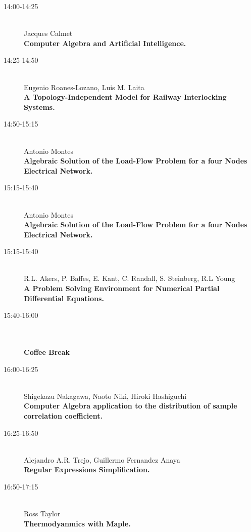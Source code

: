 \begin{description}
\item[14:00-14:25] \ \\
  Jacques Calmet\\
  {\bf Computer Algebra and Artificial Intelligence.} 
\item[14:25-14:50 ] \ \\
  Eugenio Roanes-Lozano, Luis M. Laita\\
  {\bf A Topology-Independent Model for Railway Interlocking Systems.} 
\item[14:50-15:15] \ \\
  Antonio Montes \\
  {\bf Algebraic Solution of the Load-Flow Problem for a four Nodes Electrical Network.
} 
\item[15:15-15:40] \ \\
  Antonio Montes\\
  {\bf Algebraic Solution of the Load-Flow Problem for a four Nodes Electrical Network.} 
\item[15:15-15:40] \ \\
  R.L. Akers, P. Baffes, E. Kant, C. Randall, S. Steinberg, R.L Young
\\
  {\bf A Problem Solving Environment for Numerical Partial
    Differential Equations.} 
\item[15:40-16:00] \ \\
  \\
  {\bf Coffee Break} 
\item[16:00-16:25] \ \\
  Shigekazu Nakagawa, Naoto Niki, Hiroki Hashiguchi
\\
  {\bf Computer Algebra application to the distribution of sample
    correlation  coefficient.} 
\item[16:25-16:50 ] \ \\
  Alejandro A.R. Trejo, Guillermo Fernandez Anaya
\\
  {\bf Regular Expressions Simplification.
} 
\item[16:50-17:15 ] \ \\
  Ross Taylor\\
  {\bf Thermodyanmics with Maple.} 
\end{description}


